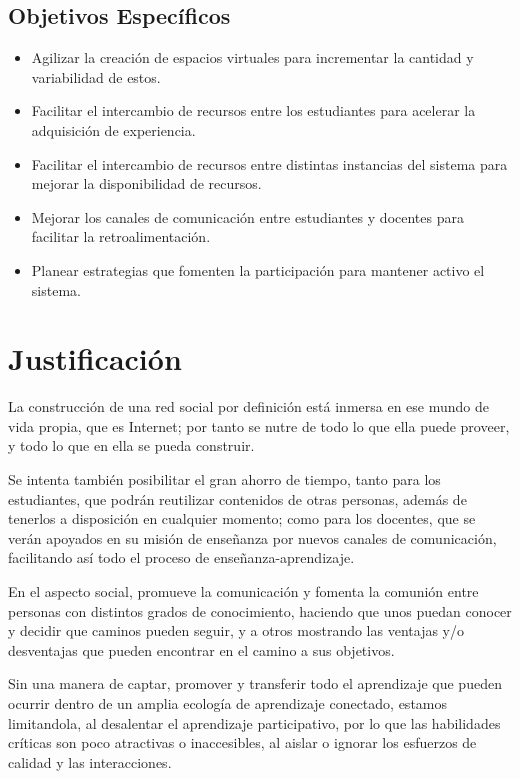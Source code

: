 \subsection{Objetivos Específicos}
\begin{itemize}
\item Agilizar la creación de espacios virtuales para incrementar la cantidad y
variabilidad de estos.
\item Facilitar el intercambio de recursos entre los estudiantes para acelerar
la adquisición de experiencia.
\item Facilitar el intercambio de recursos entre distintas instancias del
sistema para mejorar la disponibilidad de recursos.
\item Mejorar los canales de comunicación entre estudiantes y docentes para
facilitar la retroalimentación.
\item Planear estrategias que fomenten la participación para mantener activo el
sistema.
\end{itemize}

\section{Justificación}
La construcción de una red social por definición está inmersa en ese mundo de
vida propia, que es Internet; por tanto se nutre de todo lo que ella puede
proveer, y todo lo que en ella se pueda construir.

Se intenta también posibilitar el gran ahorro de tiempo, tanto para los
estudiantes, que podrán reutilizar contenidos de otras personas, además de
tenerlos a disposición en cualquier momento; como para los docentes, que se
verán apoyados en su misión de enseñanza por nuevos canales de comunicación,
facilitando así todo el proceso de enseñanza-aprendizaje.

En el aspecto social, promueve la comunicación y fomenta la comunión entre
personas con distintos grados de conocimiento, haciendo que unos puedan conocer
y decidir que caminos pueden seguir, y a otros mostrando las ventajas y/o
desventajas que pueden encontrar en el camino a sus objetivos.

Sin una manera de captar, promover y transferir todo el aprendizaje que pueden
ocurrir dentro de un amplia ecología de aprendizaje conectado, estamos
limitandola, al desalentar el aprendizaje participativo, por lo que las
habilidades críticas son poco atractivas o inaccesibles, al aislar o ignorar
los esfuerzos de calidad y las interacciones\cite{Santamaria}.

